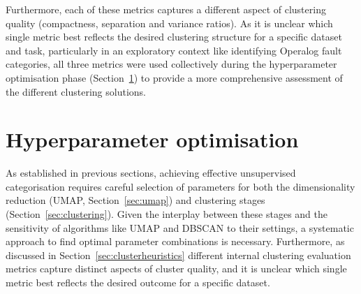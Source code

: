 \documentclass[10pt,oneside]{report}
\begin{document}
Furthermore, each of these metrics captures a different aspect of clustering quality (compactness, separation and variance ratios). As it is unclear which single metric best reflects the desired clustering structure for a specific dataset and task, particularly in an exploratory context like identifying Operalog fault categories, all three metrics were used collectively during the hyperparameter optimisation phase (Section~\ref{sec:hyperparameterOpt}) to provide a more comprehensive assessment of the different clustering solutions.


\section{Hyperparameter optimisation}\label{sec:hyperparameterOpt}

As established in previous sections, achieving effective unsupervised categorisation requires careful selection of parameters for both the dimensionality reduction (UMAP, Section~\ref{sec:umap}) and clustering stages (Section~\ref{sec:clustering}). Given the interplay between these stages and the sensitivity of algorithms like UMAP and DBSCAN to their settings, a systematic approach to find optimal parameter combinations is necessary. Furthermore, as discussed in Section~\ref{sec:clusterheuristics} different internal clustering evaluation metrics capture distinct aspects of cluster quality, and it is unclear which single metric best reflects the desired outcome for a specific dataset.   
\end{document}
